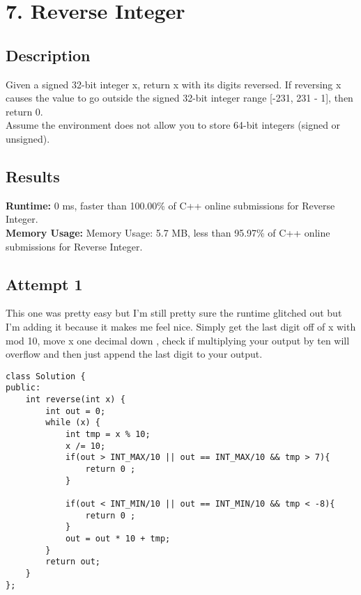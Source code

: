 \chapter{7. Reverse Integer}
\section{Description}
Given a signed 32-bit integer x, return x with its digits reversed. If reversing x causes the value to go outside the signed 32-bit integer range [-231, 231 - 1], then return 0.
\\
Assume the environment does not allow you to store 64-bit integers (signed or unsigned).
\section{Results}
\textbf{Runtime:}
0 ms, faster than 100.00\% of C++ online submissions for Reverse Integer.\\
\textbf{Memory Usage:}
Memory Usage: 5.7 MB, less than 95.97\% of C++ online submissions for Reverse Integer.\\
\newpage
\section{Attempt 1}
This one was pretty easy but I'm still pretty sure the runtime glitched out but I'm adding it because it makes me feel nice. Simply get the last digit off of x with mod 10, move x one decimal down
, check if multiplying your output by ten will overflow and then just append the last digit to your output.
\begin{lstlisting}
class Solution {
public:
    int reverse(int x) {
        int out = 0;
        while (x) {
            int tmp = x % 10;
            x /= 10;
            if(out > INT_MAX/10 || out == INT_MAX/10 && tmp > 7){
                return 0 ;
            }

            if(out < INT_MIN/10 || out == INT_MIN/10 && tmp < -8){
                return 0 ;
            }
            out = out * 10 + tmp;
        }
        return out;
    }
};
\end{lstlisting}
